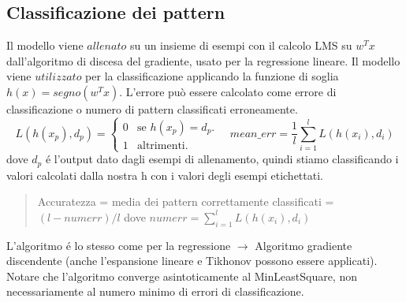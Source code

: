 \documentclass{article}
\begin{document}
\subsection{Classificazione dei pattern}
Il modello viene $allenato$ su un insieme di esempi con il calcolo LMS su $w^Tx$ dall'algoritmo di discesa del gradiente, usato per la regressione lineare. Il modello viene $utilizzato$ per la classificazione applicando la funzione di soglia $h(x)=segno(w^Tx)$. L'errore può essere calcolato come errore di classificazione o numero di pattern classificati erroneamente. 
\begin{equation}
  L(h(x_p),d_p)=\begin{cases}
    0 & \text{se $h(x_p)=d_p$}.\\
    1 & \text{altrimenti}.
  \end{cases}
  \quad mean\_err = \frac{1}{l}\sum_{i=1}^l L(h(x_i), d_i)
\end{equation}
dove $d_p$ é l'output dato dagli esempi di allenamento, quindi stiamo classificando i valori calcolati dalla nostra h con i valori degli esempi etichettati.
\begin{quote}
    Accuratezza = media dei pattern correttamente classificati = $(l-numerr)/l$ \newline dove $numerr=\sum_{i=1}^l L(h(x_i), d_i)$
\end{quote}
L'algoritmo é lo stesso come per la regressione $\rightarrow$ Algoritmo gradiente discendente (anche l'espansione lineare e Tikhonov possono essere applicati). Notare che l'algoritmo converge asintoticamente al MinLeastSquare, non necessariamente al numero minimo di errori di classificazione.
\end{document}
